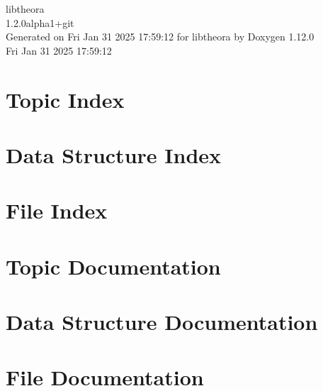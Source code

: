 \documentclass[twoside]{book}
\newcommand{\+}{\discretionary{\mbox{\scriptsize$\hookleftarrow$}}{}{}}
\newcommand{\clearemptydoublepage}{%
    \newpage{\pagestyle{empty}\cleardoublepage}%
  }
\begin{document}
  \raggedbottom
  \begin{titlepage}
  \vspace*{7cm}
  \begin{center}%
  {\Large libtheora}\\
  [1ex]\large 1.\+2.\+0alpha1+git \\
  \vspace*{1cm}
  {\large Generated on Fri Jan 31 2025 17\+:59\+:12 for libtheora by Doxygen 1.12.0}\\
    \vspace*{0.5cm}
    {\small Fri Jan 31 2025 17:59:12}
  \end{center}
  \end{titlepage}
  \clearemptydoublepage
  \tableofcontents
  \clearemptydoublepage

\chapter{Topic Index}

\chapter{Data Structure Index}

\chapter{File Index}

\chapter{Topic Documentation}




\chapter{Data Structure Documentation}











\chapter{File Documentation}








  \backmatter
  \newpage
  \clearemptydoublepage
  \printindex
\end{document}
